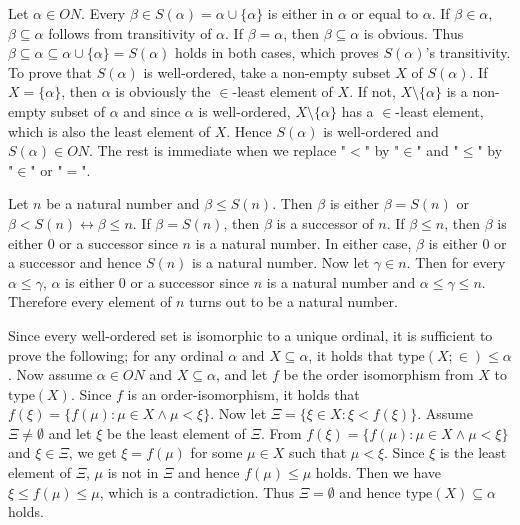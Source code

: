 \documentclass[12pt]{article}
\theoremstyle{definition}
\newenvironment{customthm}[1]
  {\renewcommand\theinnercustomthm{#1}\innercustomthm}
  {\endinnercustomthm}
\begin{document}
\begin{customthm}{I.8.11} Let $\alpha\in ON$. Every $\beta\in S(\alpha)=\alpha\cup\{\alpha\}$ is either in $\alpha$ or equal to $\alpha$. If $\beta\in\alpha$, $\beta\subseteq\alpha$ follows from transitivity of $\alpha$. If $\beta=\alpha$, then $\beta\subseteq \alpha$ is obvious.
Thus $\beta\subseteq\alpha\subseteq\alpha\cup\{\alpha\}=S(\alpha)$ holds in both cases, which proves $S(\alpha)$'s transitivity. To prove that $S(\alpha)$ is well-ordered, take a non-empty subset $X$ of $S(\alpha)$. If $X=\{\alpha\}$, then $\alpha$ is obviously the $\in$-least element of $X$. If not, $X\setminus\{\alpha\}$ is a non-empty subset of $\alpha$ and since $\alpha$ is well-ordered, $X\setminus\{\alpha\}$ has a $\in$-least element, which is also the least element of $X$.
Hence $S(\alpha)$ is well-ordered and $S(\alpha)\in ON$. The rest is immediate when we replace "$<$" by "$\in$" and "$\leq$" by "$\in$" or "$=$".
\end{customthm}

\begin{customthm}{I.8.13} Let $n$ be a natural number and $\beta\leq S(n)$. Then $\beta$ is either $\beta=S(n)$ or $\beta<S(n)\leftrightarrow\beta\leq n$. If $\beta=S(n)$, then $\beta$ is a successor of $n$. If $\beta\leq n$, then $\beta$ is either 0 or a successor since $n$ is a natural number. In either case, $\beta$ is either 0 or a successor and hence $S(n)$ is a natural number.
Now let $\gamma\in n$. Then for every $\alpha\leq\gamma$, $\alpha$ is either 0 or a successor since $n$ is a natural number and $\alpha\leq\gamma\leq n$. Therefore every element of $n$ turns out to be a natural number.
\end{customthm}

\begin{customthm}{I.8.22} Since every well-ordered set is isomorphic to a unique ordinal, it is sufficient to prove the following; for any ordinal $\alpha$ and $X\subseteq\alpha$, it holds that $\mathrm{type}(X;\in)\leq\alpha$. Now assume $\alpha\in ON$ and  $X\subseteq\alpha$, and let $f$ be the order isomorphism from $X$ to $\mathrm{type}(X)$. Since $f$ is an order-isomorphism, it holds that $f(\xi)=\{f(\mu):\mu\in X\wedge\mu<\xi\}$.
Now let $\Xi = \{\xi\in X:\xi<f(\xi)\}$. Assume $\Xi\neq\emptyset$ and let $\xi$ be the least element of $\Xi$. From $f(\xi)=\{f(\mu):\mu\in X\wedge\mu<\xi\}$ and $\xi\in\Xi$, we get $\xi=f(\mu)$ for some $\mu\in X$ such that $\mu<\xi$.
Since $\xi$ is the least element of $\Xi$, $\mu$ is not in $\Xi$ and hence $f(\mu)\leq\mu$ holds. Then we have $\xi\leq f(\mu)\leq\mu$, which is a contradiction. Thus $\Xi=\emptyset$ and hence $\mathrm{type}(X)\subseteq\alpha$ holds.
\end{customthm}
\end{document}
